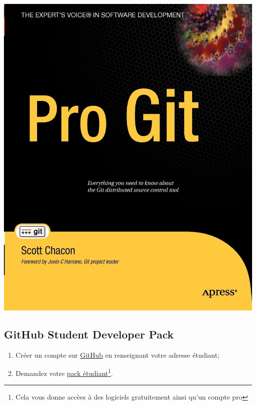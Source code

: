 \documentclass[10pt]{beamer}
\begin{document}
\begin{frame}{\subsecname}
    \centerline{\includegraphics[height=0.8\textheight]{img/git pro.jpg}}
\end{frame}


\subsection{GitHub Student Developer Pack}
\begin{frame}{\subsecname}
    \begin{enumerate}
        \item Créer un compte sur \href{https://github.com/join}{GitHub} en renseignant votre adresse étudiant;
        \item Demandez votre \href{https://education.github.com/pack}{pack étudiant}\footnote{Cela vous donne accèes à des logiciels gratuitement ainsi qu'un compte pro}.
    \end{enumerate}

\end{frame}
\end{document}
